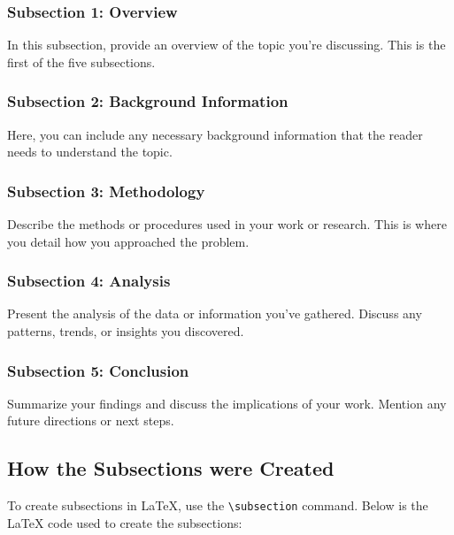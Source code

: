\documentclass[12pt,a4paper]{article}
\begin{document}
	\subsubsection{Subsection 1: Overview}
	In this subsection, provide an overview of the topic you're discussing. This is the first of the five subsections.
	
	\subsubsection{Subsection 2: Background Information}
	Here, you can include any necessary background information that the reader needs to understand the topic.
	
	\subsubsection{Subsection 3: Methodology}
	Describe the methods or procedures used in your work or research. This is where you detail how you approached the problem.
	
	\subsubsection{Subsection 4: Analysis}
	Present the analysis of the data or information you've gathered. Discuss any patterns, trends, or insights you discovered.
	
	\subsubsection{Subsection 5: Conclusion}
	Summarize your findings and discuss the implications of your work. Mention any future directions or next steps.
 \vspace{0.5cm}
\subsection{How the Subsections were Created}
To create subsections in LaTeX, use the \texttt{\textbackslash subsection} command. Below is the LaTeX code used to create the subsections:
\end{document}
